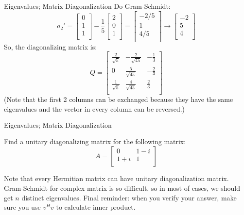 \documentclass{beamer}
\begin{document}
\begin{frame}{Eigenvalues; Matrix Diagonalization}
    Do Gram-Schmidt:
    \begin{equation*}
        a_2'=\left[ \begin{array}{c}
        0\\
        1\\
        1\\
    \end{array} \right] -\frac{1}{5}\left[ \begin{array}{c}
        2\\
        0\\
        1\\
    \end{array} \right] =\left[ \begin{array}{c}
        -2/5\\
        1\\
        4/5\\
    \end{array} \right]\rightarrow \left[ \begin{array}{c}
        -2\\
        5\\
        4\\
    \end{array} \right]
    \end{equation*}
    So, the diagonalizing matrix is:
    \begin{equation*}
        Q=\left[ \begin{matrix}
        \frac{2}{\sqrt{5}}&		-\frac{2}{\sqrt{45}}&		-\frac{1}{3}\\
        0&		\frac{5}{\sqrt{45}}&		-\frac{2}{3}\\
        \frac{1}{\sqrt{5}}&		\frac{4}{\sqrt{45}}&		\frac{2}{3}\\
    \end{matrix} \right]
    \end{equation*}
    (Note that the first 2 columns can be exchanged because they have the same eigenvalues and the vector in every column can be reversed.)
\end{frame}

\begin{frame}{Eigenvalues; Matrix Diagonalization}
    \begin{example}
    Find a unitary diagonalizing matrix for the following matrix:
\begin{equation*}
    A=\left[ \begin{matrix}
	0&		1-i\\
	1+i&		1\\
\end{matrix} \right]
\end{equation*}
    \end{example}

Note that every Hermitian matrix can have unitary diagonalization matrix. Gram-Schmidt for complex matrix is so difficult, so in most of cases, we should get $n$ distinct eigenvalues. Final reminder: when you verify your answer, make sure you use $v^Hv$ to calculate inner product.

\end{frame}
\end{document}
